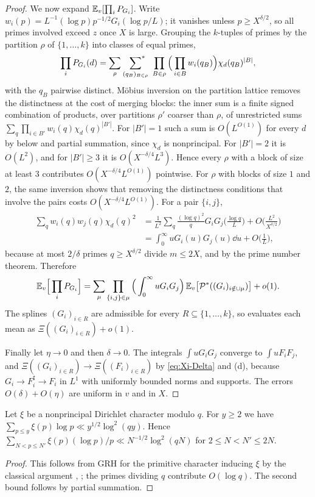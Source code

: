 \documentclass[11pt,colorlinks]{charlie}
\begin{document}
\begin{proof}
We now expand $\mathbb{E}_v[\prod_iP_{G_i}]$. Write $w_i(p)=L^{-1}(\log p)p^{-1/2}G_i(\log p/L)$; it vanishes unless $p\ge X^{\delta/2}$, so all primes involved exceed $z$ once $X$ is large. Grouping the $k$-tuples of primes by the partition $\rho$ of $\{1,\dots,k\}$ into classes of equal primes,
\[
 \prod_iP_{G_i}(d)=\sum_\rho\ \sideset{}{^*}\sum_{(q_B)_{B\in\rho}}\ \prod_{B\in\rho}\Big(\prod_{i\in B}w_i(q_B)\Big)\chi_d(q_B)^{|B|},
\]
with the $q_B$ pairwise distinct. M\"obius inversion on the partition lattice removes the distinctness at the cost of merging blocks: the inner sum is a finite signed combination of products, over partitions $\rho'$ coarser than $\rho$, of unrestricted sums $\sum_q\prod_{i\in B'}w_i(q)\chi_d(q)^{|B'|}$. For $|B'|=1$ such a sum is $O(L^{O(1)})$ for every $d$ by  below and partial summation, since $\chi_d$ is nonprincipal. For $|B'|=2$ it is $O(L^2)$, and for $|B'|\ge3$ it is $O(X^{-\delta/4}L^3)$. Hence every $\rho$ with a block of size at least $3$ contributes $O(X^{-\delta/4}L^{O(1)})$ pointwise. For $\rho$ with blocks of size $1$ and $2$, the same inversion shows that removing the distinctness conditions that involve the pairs costs $O(X^{-\delta/4}L^{O(1)})$. For a pair $\{i,j\}$,
\begin{align*}
 \sum_qw_i(q)w_j(q)\chi_d(q)^2&=\frac1{L^2}\sum_q\frac{(\log q)^2}qG_iG_j\Big(\frac{\log q}L\Big)+O\Big(\frac{L^2}{X^{\delta/2}}\Big)\\
 &=\int_0^\infty uG_i(u)G_j(u)\dd u+O\Big(\frac1L\Big),
\end{align*}
because at most $2/\delta$ primes $q\ge X^{\delta/2}$ divide $m\le2X$, and by the prime number theorem. Therefore
\[
 \mathbb{E}_v\Big[\prod_iP_{G_i}\Big]=\sum_\mu\prod_{\{i,j\}\in\mu}\Big(\int_0^\infty uG_iG_j\Big)\,\mathbb{E}_v\big[\mathcal P^*((G_i)_{i\notin\cup\mu})\big]+o(1).
\]
The splines $(G_i)_{i\in R}$ are admissible for every $R\subseteq\{1,\dots,k\}$, so  evaluates each mean as $\Xi((G_i)_{i\in R})+o(1)$.

Finally let $\eta\to0$ and then $\delta\to0$. The integrals $\int uG_iG_j$ converge to $\int uF_iF_j$, and $\Xi((G_i)_{i\in R})\to\Xi((F_i)_{i\in R})$ by \eqref{eq:Xi-Delta} and (d), because $G_i\to F_i^\sharp\to F_i$ in $L^1$ with uniformly bounded norms and supports. The errors $O(\delta)+O(\eta)$ are uniform in $v$ and in $X$.
\end{proof}

\begin{lemma}\label{lem:grh-primes}
Let $\xi$ be a nonprincipal Dirichlet character modulo $q$. For $y\ge2$ we have $\sum_{p\le y}\xi(p)\log p\ll y^{1/2}\log^2(qy)$. Hence $\sum_{N<p\le N'}\xi(p)(\log p)/p\ll N^{-1/2}\log^2(qN)$ for $2\le N<N'\le2N$.
\end{lemma}
\begin{proof}
This follows from GRH for the primitive character inducing $\xi$ \cite{Alpoge} by the classical argument \cite[\S20]{Davenport}, \cite[Theorem~5.15]{IK}; the primes dividing $q$ contribute $O(\log q)$. The second bound follows by partial summation.
\end{proof}
\end{document}
